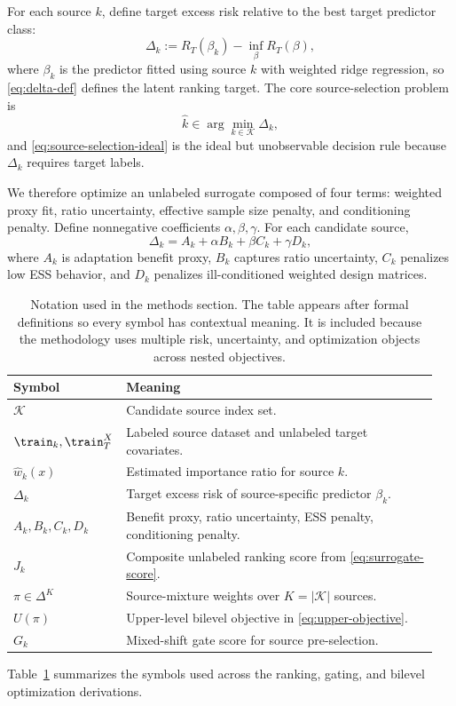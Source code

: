 \documentclass{article} %
\begin{document}
For each source \(k\), define target excess risk relative to the best target predictor class:
\begin{equation}
\Delta_k := R_T(\beta_k)-\inf_{\beta}R_T(\beta),
\label{eq:delta-def}
\end{equation}
where \(\beta_k\) is the predictor fitted using source \(k\) with weighted ridge regression, so \eqref{eq:delta-def} defines the latent ranking target. The core source-selection problem is
\begin{equation}
\hat k\in \arg\min_{k\in\mathcal{K}} \Delta_k,
\label{eq:source-selection-ideal}
\end{equation}
and \eqref{eq:source-selection-ideal} is the ideal but unobservable decision rule because \(\Delta_k\) requires target labels.

We therefore optimize an unlabeled surrogate composed of four terms: weighted proxy fit, ratio uncertainty, effective sample size penalty, and conditioning penalty. Define nonnegative coefficients \(\alpha,\beta,\gamma\). For each candidate source,
\begin{equation}
\Delta_k = A_k + \alpha B_k + \beta C_k + \gamma D_k,
\label{eq:decomposition}
\end{equation}
where \(A_k\) is adaptation benefit proxy, \(B_k\) captures ratio uncertainty, \(C_k\) penalizes low ESS behavior, and \(D_k\) penalizes ill-conditioned weighted design matrices.

\begin{table}[t]
\caption{Notation used in the methods section. The table appears after formal definitions so every symbol has contextual meaning. It is included because the methodology uses multiple risk, uncertainty, and optimization objects across nested objectives.}
\label{tab:notation}
\centering
\small
\renewcommand{\arraystretch}{1.1}
\setlength{\tabcolsep}{4pt}
\begin{tabular}{p{0.2\linewidth}p{0.75\linewidth}}
\hline
Symbol & Meaning \\
\hline
\(\mathcal{K}\) & Candidate source index set. \\
\(\train_k,\train_T^X\) & Labeled source dataset and unlabeled target covariates. \\
\(\hat w_k(x)\) & Estimated importance ratio for source \(k\). \\
\(\Delta_k\) & Target excess risk of source-specific predictor \(\beta_k\). \\
\(A_k,B_k,C_k,D_k\) & Benefit proxy, ratio uncertainty, ESS penalty, conditioning penalty. \\
\(J_k\) & Composite unlabeled ranking score from \eqref{eq:surrogate-score}. \\
\(\pi\in\Delta^{K}\) & Source-mixture weights over \(K=|\mathcal{K}|\) sources. \\
\(U(\pi)\) & Upper-level bilevel objective in \eqref{eq:upper-objective}. \\
\(G_k\) & Mixed-shift gate score for source pre-selection. \\
\hline
\end{tabular}
\end{table}
Table~\ref{tab:notation} summarizes the symbols used across the ranking, gating, and bilevel optimization derivations.
\end{document}
